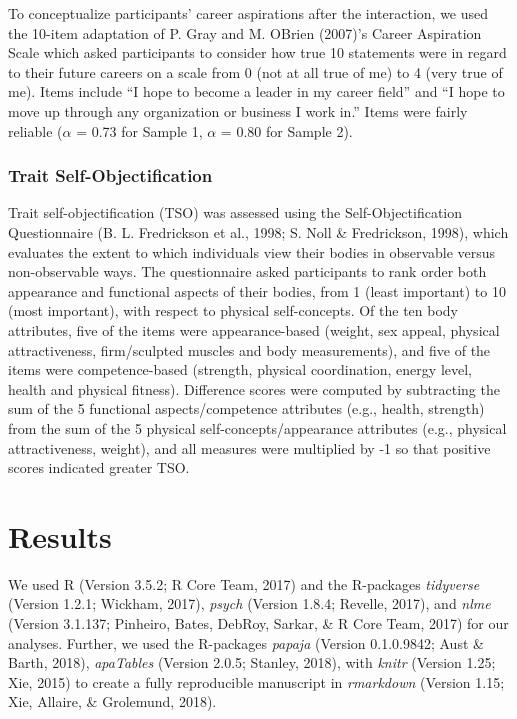 \documentclass[man]{apa6}
\begin{document}
To conceptualize participants' career aspirations after the interaction,
we used the 10-item adaptation of P. Gray and M. OBrien (2007)'s Career
Aspiration Scale which asked participants to consider how true 10
statements were in regard to their future careers on a scale from 0 (not
at all true of me) to 4 (very true of me). Items include \enquote{I hope
to become a leader in my career field} and \enquote{I hope to move up
through any organization or business I work in.} Items were fairly
reliable (\(\alpha\) = 0.73 for Sample 1, \(\alpha\) = 0.80 for Sample
2).

\subsubsection{Trait
Self-Objectification}\label{trait-self-objectification}

Trait self-objectification (TSO) was assessed using the
Self-Objectification Questionnaire (B. L. Fredrickson et al., 1998; S.
Noll \& Fredrickson, 1998), which evaluates the extent to which
individuals view their bodies in observable versus non-observable ways.
The questionnaire asked participants to rank order both appearance and
functional aspects of their bodies, from 1 (least important) to 10 (most
important), with respect to physical self-concepts. Of the ten body
attributes, five of the items were appearance-based (weight, sex appeal,
physical attractiveness, firm/sculpted muscles and body measurements),
and five of the items were competence-based (strength, physical
coordination, energy level, health and physical fitness). Difference
scores were computed by subtracting the sum of the 5 functional
aspects/competence attributes (e.g., health, strength) from the sum of
the 5 physical self-concepts/appearance attributes (e.g., physical
attractiveness, weight), and all measures were multiplied by -1 so that
positive scores indicated greater TSO.

\section{Results}\label{results}

We used R (Version 3.5.2; R Core Team, 2017) and the R-packages
\emph{tidyverse} (Version 1.2.1; Wickham, 2017), \emph{psych} (Version
1.8.4; Revelle, 2017), and \emph{nlme} (Version 3.1.137; Pinheiro,
Bates, DebRoy, Sarkar, \& R Core Team, 2017) for our analyses. Further,
we used the R-packages \emph{papaja} (Version 0.1.0.9842; Aust \& Barth,
2018), \emph{apaTables} (Version 2.0.5; Stanley, 2018), with
\emph{knitr} (Version 1.25; Xie, 2015) to create a fully reproducible
manuscript in \emph{rmarkdown} (Version 1.15; Xie, Allaire, \&
Grolemund, 2018).
\end{document}
